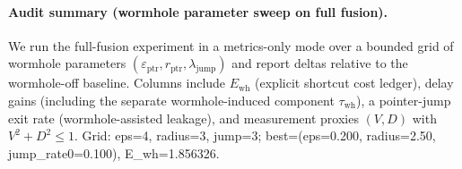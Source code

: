 \paragraph{Audit summary (wormhole parameter sweep on full fusion).} \AuditTag We run the full-fusion experiment in a metrics-only mode over a bounded grid of wormhole parameters $(\varepsilon_{\mathrm{ptr}}, r_{\mathrm{ptr}}, \lambda_{\mathrm{jump}})$ and report deltas relative to the wormhole-off baseline. Columns include $E_{\mathrm{wh}}$ (explicit shortcut cost ledger), delay gains (including the separate wormhole-induced component $\tau_{\mathrm{wh}}$), a pointer-jump exit rate (wormhole-assisted leakage), and measurement proxies $(V,D)$ with $V^2+D^2\le 1$. Grid: eps=4, radius=3, jump=3; best=(eps=0.200, radius=2.50, jump_rate0=0.100), E_wh=1.856326.